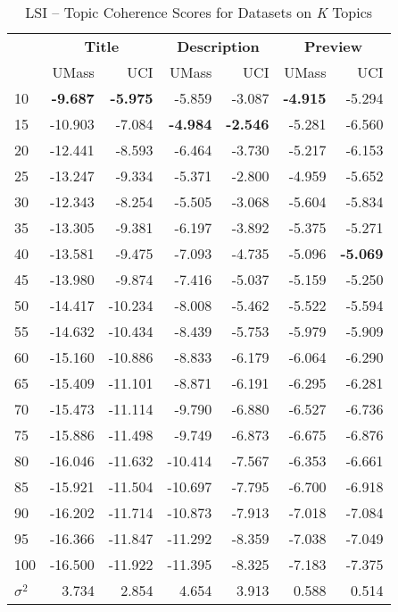 \documentclass[letterpaper,12pt]{article}
\begin{document}
\begin{table}
	\caption{\label{tab:lsi_data_comp} LSI -- Topic Coherence Scores for Datasets on \emph{K} Topics}
	\begin{center}
		\begin{tabular}{| l | rr | rr | rr |}
			\hline
			{} & \multicolumn{2}{c|}{\textbf{Title}} & \multicolumn{2}{c|}{\textbf{Description}} & \multicolumn{2}{c|}{\textbf{Preview}} \\
			{} &       UMass &    UCI &  UMass &    UCI &   UMass &    UCI \\
			\hline
				10  &  \textbf{-9.687} &  \textbf{-5.975} &      -5.859 & -3.087 &  \textbf{-4.915} & -5.294 \\
				15  & -10.903 &  -7.084 &      \textbf{-4.984} & \textbf{-2.546} &  -5.281 & -6.560 \\
				20  & -12.441 &  -8.593 &      -6.464 & -3.730 &  -5.217 & -6.153 \\
				25  & -13.247 &  -9.334 &      -5.371 & -2.800 &  -4.959 & -5.652 \\
				30  & -12.343 &  -8.254 &      -5.505 & -3.068 &  -5.604 & -5.834 \\
				35  & -13.305 &  -9.381 &      -6.197 & -3.892 &  -5.375 & -5.271 \\
				40  & -13.581 &  -9.475 &      -7.093 & -4.735 &  -5.096 & \textbf{-5.069} \\
				45  & -13.980 &  -9.874 &      -7.416 & -5.037 &  -5.159 & -5.250 \\
				50  & -14.417 & -10.234 &      -8.008 & -5.462 &  -5.522 & -5.594 \\
				55  & -14.632 & -10.434 &      -8.439 & -5.753 &  -5.979 & -5.909 \\
				60  & -15.160 & -10.886 &      -8.833 & -6.179 &  -6.064 & -6.290 \\
				65  & -15.409 & -11.101 &      -8.871 & -6.191 &  -6.295 & -6.281 \\
				70  & -15.473 & -11.114 &      -9.790 & -6.880 &  -6.527 & -6.736 \\
				75  & -15.886 & -11.498 &      -9.749 & -6.873 &  -6.675 & -6.876 \\
				80  & -16.046 & -11.632 &     -10.414 & -7.567 &  -6.353 & -6.661 \\
				85  & -15.921 & -11.504 &     -10.697 & -7.795 &  -6.700 & -6.918 \\
				90  & -16.202 & -11.714 &     -10.873 & -7.913 &  -7.018 & -7.084 \\
				95  & -16.366 & -11.847 &     -11.292 & -8.359 &  -7.038 & -7.049 \\
				100 & -16.500 & -11.922 &     -11.395 & -8.325 &  -7.183 & -7.375 \\
			\hline
			$\sigma^2$ & 3.734 & 2.854 & 4.654 & 3.913 & 0.588 & 0.514 \\
			\hline
			\end{tabular}
	\end{center}
\end{table}
\end{document}
